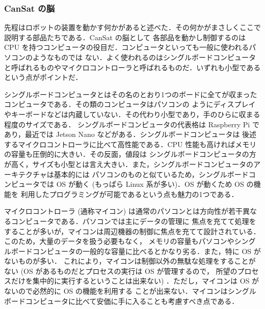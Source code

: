 \documentclass[dvipdfmx]{jsarticle}
\begin{document}
\subsubsection{CanSat の脳}
\label{subsub:CanSat の脳}

先程はロボットの装置を動かす何かがあると述べた．その何かがまさしくここで説明する部品たちである．CanSat の脳として
各部品を動かし制御するのは CPU を持つコンピュータの役目だ．コンピュータといっても一般に使われるパソコンのようなものでは
ない．よく使われるのはシングルボードコンピュータと呼ばれるものやマイクロコントローラと呼ばれるものだ．いずれも小型である
という点がポイントだ．

シングルボードコンピュータとはその名のとおり1つのボードに全てが収まったコンピュータである．その類のコンピュータはパソコンの
ようにディスプレイやキーボードなどは内蔵していない．その代わり小型であり，手のひらに収まる程度のサイズである．
シングルボードコンピュータの代表格は Raspberry Pi であり，最近では Jetson Nano などがある．シングルボードコンピュータは
後述するマイクロコントローラに比べて高性能である．CPU 性能も高ければメモリの容量も圧倒的に大きい．その反面，値段は
シングルボードコンピュータの方が高く，サイズも小型とは言え大きい．また，シングルボードコンピュータのアーキテクチャは基本的には
パソコンのものと似ているため，シングルボードコンピュータでは OS が動く (もっぱら Linux 系が多い)．OS が動くため OS の機能を
利用したプログラミングが可能であるという点も魅力の1つである．

マイクロコントローラ (通称マイコン) は通常のパソコンとは方向性が若干異なるコンピュータである．パソコンでは主にデータの管理に
焦点を充てて処理をすることが多いが，マイコンは周辺機器の制御に焦点を充てて設計されている．このため，大量のデータを扱う必要もなく，
メモリの容量もパソコンやシングルボードコンピュータの一般的な容量に比べるとかなり劣る．また，特に OS がないものが多い．
これにより，マイコンは制御以外の無駄な処理をすることがない (OS があるものだとプロセスの実行は OS が管理するので，
所望のプロセスだけを集中的に実行するということは出来ない) ．ただし，マイコンは OS がないので必然的に OS の機能を利用する
ことが出来ない．マイコンはシングルボードコンピュータに比べて安価に手に入ることも考慮すべき点である．
\end{document}
